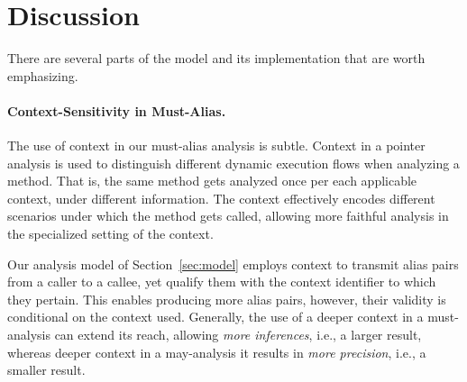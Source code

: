 \section{Discussion}

There are several parts of the model and its implementation that are
worth emphasizing.

\paragraph{Context-Sensitivity in Must-Alias.}

The use of context in our must-alias analysis is subtle.
Context in a pointer analysis is used to distinguish
different dynamic execution flows when analyzing a method. That is,
the same method gets analyzed once per each applicable context,
under different information. The context effectively encodes different
scenarios under which the method gets called, allowing more faithful
analysis in the specialized setting of the context.

Our analysis model of Section~\ref{sec:model} employs context to
transmit alias pairs from a caller to a callee, yet qualify them
with the context identifier to which they
pertain. This enables producing more alias pairs, however, their
validity is conditional on the context used.
Generally, the use of a deeper context in a must-analysis can extend
its reach, allowing \emph{more inferences}, i.e., a larger result,
whereas deeper context in a may-analysis it results in \emph{more
  precision}, i.e., a smaller result.

